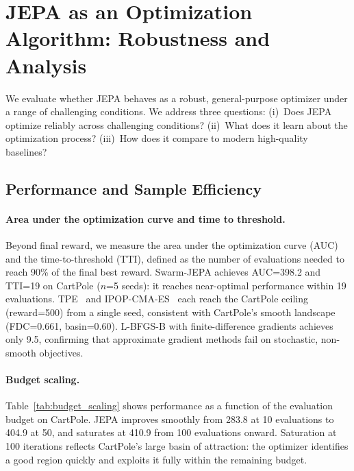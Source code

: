 
\section{JEPA as an Optimization Algorithm: Robustness and Analysis}
\label{sec:robustness}

We evaluate whether JEPA behaves as a robust, general-purpose optimizer
under a range of challenging conditions.
We address three questions:
(i)~Does JEPA optimize reliably across challenging conditions?
(ii)~What does it learn about the optimization process?
(iii)~How does it compare to modern high-quality baselines?

\subsection{Performance and Sample Efficiency}
\label{sec:performance_analysis}

\paragraph{Area under the optimization curve and time to threshold.}
Beyond final reward, we measure the area under the optimization curve (AUC)
and the time-to-threshold (TTI), defined as the number of evaluations
needed to reach 90\% of the final best reward.
Swarm-JEPA achieves AUC=398.2 and TTI=19 on CartPole ($n$=5 seeds):
it reaches near-optimal performance within 19 evaluations.
TPE~\citep{bergstra2011algorithms} and IPOP-CMA-ES~\citep{auger2005restart}
each reach the CartPole ceiling (reward=500) from a single seed,
consistent with CartPole's smooth landscape (FDC=0.661, basin=0.60).
L-BFGS-B with finite-difference gradients achieves only 9.5,
confirming that approximate gradient methods fail on stochastic,
non-smooth objectives.

\paragraph{Budget scaling.}
Table~\ref{tab:budget_scaling} shows performance as a function of
the evaluation budget on CartPole.
JEPA improves smoothly from 283.8 at 10 evaluations to 404.9 at 50,
and saturates at 410.9 from 100 evaluations onward.
Saturation at 100 iterations reflects CartPole's large basin of
attraction: the optimizer identifies a good region quickly
and exploits it fully within the remaining budget.

